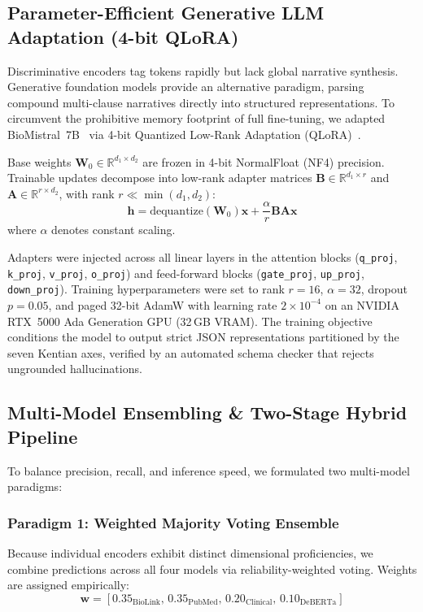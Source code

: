 \subsection{Parameter-Efficient Generative LLM Adaptation (4-bit QLoRA)}

Discriminative encoders tag tokens rapidly but lack global narrative synthesis. Generative foundation models provide an alternative paradigm, parsing compound multi-clause narratives directly into structured representations. To circumvent the prohibitive memory footprint of full fine-tuning, we adapted BioMistral~7B~\cite{labrak2024biomistral} via 4-bit Quantized Low-Rank Adaptation (QLoRA)~\cite{dettmers2023qlora}.

Base weights $\mathbf{W}_0 \in \mathbb{R}^{d_1 \times d_2}$ are frozen in 4-bit NormalFloat (NF4) precision. Trainable updates decompose into low-rank adapter matrices $\mathbf{B} \in \mathbb{R}^{d_1 \times r}$ and $\mathbf{A} \in \mathbb{R}^{r \times d_2}$, with rank $r \ll \min(d_1, d_2)$:
\begin{equation}
    \mathbf{h} = \text{dequantize}(\mathbf{W}_0)\mathbf{x} + \frac{\alpha}{r}\mathbf{B}\mathbf{A}\mathbf{x}
\end{equation}
where $\alpha$ denotes constant scaling.

Adapters were injected across all linear layers in the attention blocks (\texttt{q\_proj}, \texttt{k\_proj}, \texttt{v\_proj}, \texttt{o\_proj}) and feed-forward blocks (\texttt{gate\_proj}, \texttt{up\_proj}, \texttt{down\_proj}). Training hyperparameters were set to rank $r=16$, $\alpha=32$, dropout $p=0.05$, and paged 32-bit AdamW with learning rate $2 \times 10^{-4}$ on an NVIDIA RTX~5000 Ada Generation GPU (32\,GB VRAM). The training objective conditions the model to output strict JSON representations partitioned by the seven Kentian axes, verified by an automated schema checker that rejects ungrounded hallucinations.

\subsection{Multi-Model Ensembling \& Two-Stage Hybrid Pipeline}

To balance precision, recall, and inference speed, we formulated two multi-model paradigms:

\subsubsection{Paradigm 1: Weighted Majority Voting Ensemble}
Because individual encoders exhibit distinct dimensional proficiencies, we combine predictions across all four models via reliability-weighted voting. Weights are assigned empirically:
\begin{equation}
    \mathbf{w} = [0.35_{\text{BioLink}}, \, 0.35_{\text{PubMed}}, \, 0.20_{\text{Clinical}}, \, 0.10_{\text{DeBERTa}}]
\end{equation}

